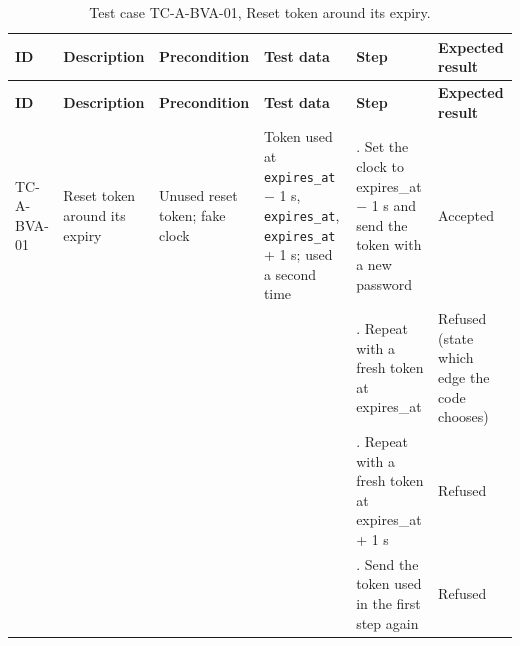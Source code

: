 {\footnotesize{}\renewcommand{\arraystretch}{1.1}
\begin{longtable}{|>{\raggedright\arraybackslash}p{}|>{\raggedright\arraybackslash}p{}|>{\raggedright\arraybackslash}p{}|>{\raggedright\arraybackslash}p{}|>{\raggedright\arraybackslash}p{}|>{\raggedright\arraybackslash}p{}|}
\caption{Test case TC-\allowbreak{}A-\allowbreak{}BVA-\allowbreak{}01, Reset token around its expiry.} \\
\hline
\textbf{ID} & \textbf{Description} & \textbf{Precondition} & \textbf{Test data} & \textbf{Step} & \textbf{Expected result} \\ \hline
\endfirsthead
\hline
\textbf{ID} & \textbf{Description} & \textbf{Precondition} & \textbf{Test data} & \textbf{Step} & \textbf{Expected result} \\ \hline
\endhead
TC-A-BVA-01 & Reset token around its expiry & Unused reset token; fake clock & Token used at \texttt{expires\_\allowbreak{}at} $-$ 1 s, \texttt{expires\_\allowbreak{}at}, \texttt{expires\_\allowbreak{}at} + 1 s; used a second time & 1. Set the clock to expires\_at $-$ 1 s and send the token with a new password & Accepted \\ \cline{5-6}
 &  &  &  & 2. Repeat with a fresh token at expires\_at & Refused (state which edge the code chooses) \\ \cline{5-6}
 &  &  &  & 3. Repeat with a fresh token at expires\_at + 1 s & Refused \\ \cline{5-6}
 &  &  &  & 4. Send the token used in the first step again & Refused \\ \hline
\end{longtable}
}

